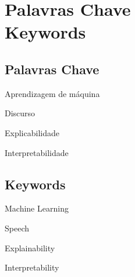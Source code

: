 \newpage


\chapter*{Palavras Chave \\ Keywords}
\thispagestyle{empty}

\section*{Palavras Chave}
{\large %

\noindent Aprendizagem de máquina

\noindent Discurso

\noindent Explicabilidade

\noindent Interpretabilidade

}

\section*{Keywords}

{\large %

\noindent Machine Learning

\noindent Speech

\noindent Explainability

\noindent Interpretability

}

\vfill

\cleardoublepage



\pagestyle{plain}



\def\contentsname{Table of Contents}
\tableofcontents
\newpage

\listoffigures
\newpage

\listoftables

\cleardoublepage


